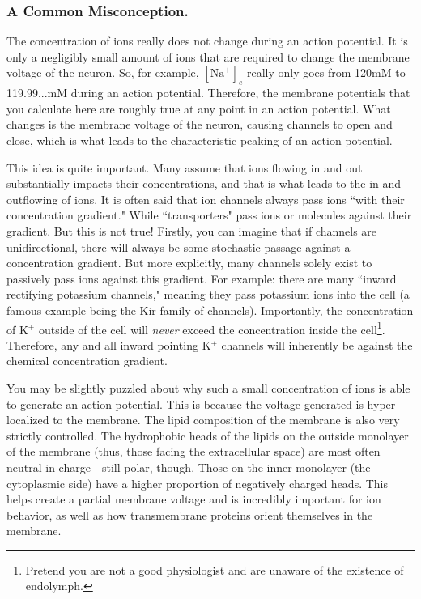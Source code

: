 \subsubsection{A Common Misconception.}

The concentration of ions really does not change during an action potential. It is only a negligibly small amount of ions that are required to change the membrane voltage of the neuron. So, for example, $[\mathrm{Na}^+]_e$ really only goes from 120mM to 119.99...mM during an action potential. Therefore, the membrane potentials that you calculate here are roughly true at any point in an action potential. What changes is the membrane voltage of the neuron, causing channels to open and close, which is what leads to the characteristic peaking of an action potential.\newline

This idea is quite important. Many assume that ions flowing in and out substantially impacts their concentrations, and that is what leads to the in and outflowing of ions. It is often said that ion channels always pass ions ``with their concentration gradient." While ``transporters" pass ions or molecules against their gradient. But this is not true! Firstly, you can imagine that if channels are unidirectional, there will always be some stochastic passage against a concentration gradient. But more explicitly, many channels solely exist to passively pass ions against this gradient. For example: there are many ``inward rectifying potassium channels," meaning they pass potassium ions into the cell (a famous example being the Kir family of channels). Importantly, the concentration of K$^+$ outside of the cell will \textit{never} exceed the concentration inside the cell\footnote{Pretend you are not a good physiologist and are unaware of the existence of endolymph.}. Therefore, any and all inward pointing K$^+$ channels will inherently be against the chemical concentration gradient.\newline

You may be slightly puzzled about why such a small concentration of ions is able to generate an action potential. This is because the voltage generated is hyper-localized to the membrane. The lipid composition of the membrane is also very strictly controlled. The hydrophobic heads of the lipids on the outside monolayer of the membrane (thus, those facing the extracellular space) are most often neutral in charge---still polar, though. Those on the inner monolayer (the cytoplasmic side) have a higher proportion of negatively charged heads. This helps create a partial membrane voltage and is incredibly important for ion behavior, as well as how transmembrane proteins orient themselves in the membrane.\newline

